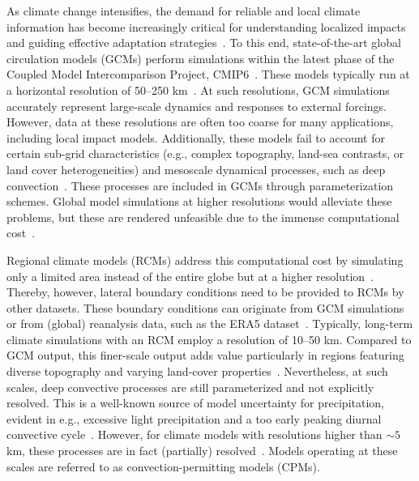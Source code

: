\documentclass[journal abbreviation, manuscript]{copernicus}
\begin{document}
As climate change intensifies, the demand for reliable and local climate information has become increasingly critical for understanding localized impacts and guiding effective adaptation strategies~\citep{IPCC_AR6_ch12}.
To this end, state-of-the-art global circulation models (GCMs) perform simulations within the latest phase of the Coupled Model Intercomparison Project, CMIP6~\citep{eyring_overview_2016}. 
These models typically run at a horizontal resolution of 50--250 km~\citep{nguyen_selecting_2024, IPCC_AR6_WG1_ANNEX2, IPCC_AR6_ch1}.
At such resolutions, GCM simulations accurately represent large-scale dynamics and responses to external forcings.
However, data at these resolutions are often too coarse for many applications, including local impact models.
Additionally, these models fail to account for certain sub-grid characteristics (e.g., complex topography, land-sea contrasts, or land cover heterogeneities) and mesoscale dynamical processes, such as deep convection~\citep{rummukainen_added_2016, giorgi_thirty_2019, lucas-picher_convection-permitting_2021}.
These processes are included in GCMs through parameterization schemes.
Global model simulations at higher resolutions would alleviate these problems, but these are rendered unfeasible due to the immense computational cost~\citep{fuhrer_near-global_2018}.

Regional climate models (RCMs) address this computational cost by simulating only a limited area instead of the entire globe but at a higher resolution~\citep{giorgi_thirty_2019}.
Thereby, however, lateral boundary conditions need to be provided to RCMs by other datasets. 
These boundary conditions can originate from GCM simulations or from (global) reanalysis data, such as the ERA5 dataset~\citep{hersbach_era5_2020}.
Typically, long-term climate simulations with an RCM employ a resolution of 10--50 km.
Compared to GCM output, this finer-scale output adds value particularly in regions featuring diverse topography and varying land-cover properties~\citep{rummukainen_added_2016, IPCC_AR6_ch10}.
Nevertheless, at such scales, deep convective processes are still parameterized and not explicitly resolved. 
This is a well-known source of model uncertainty for precipitation, evident in e.g., excessive light precipitation and a too early peaking diurnal convective cycle~\citep{ban_evaluation_2014,fosser_benefit_2015, hohenegger_towards_2008, kendon_realism_2012,vergara-temprado_climate_2020}.
However, for climate models with resolutions higher than $\sim 5$ km, these processes are in fact (partially) resolved~\citep{prein_review_2015, lucas-picher_convection-permitting_2021}.
Models operating at these scales are referred to as convection-permitting models (CPMs).
\end{document}
